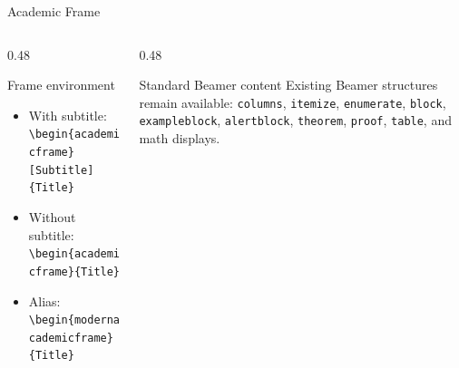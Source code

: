 \documentclass[aspectratio=169,10pt]{beamer}
\begin{document}
\begin{academicframe}{Academic Frame}
  \begin{columns}[T,onlytextwidth]
    \begin{column}{0.48\textwidth}
      \begin{block}{Frame environment}
        \scriptsize
        \begin{itemize}
          \item With subtitle:
            \texttt{\textbackslash begin\{academicframe\}[Subtitle]\{Title\}}
          \item Without subtitle:
            \texttt{\textbackslash begin\{academicframe\}\{Title\}}
          \item Alias:
            \texttt{\textbackslash begin\{modernacademicframe\}\{Title\}}
        \end{itemize}
      \end{block}
    \end{column}
    \begin{column}{0.48\textwidth}
      \begin{exampleblock}{Standard Beamer content}
        \scriptsize
        Existing Beamer structures remain available: \texttt{columns},
        \texttt{itemize}, \texttt{enumerate}, \texttt{block},
        \texttt{exampleblock}, \texttt{alertblock}, \texttt{theorem},
        \texttt{proof}, \texttt{table}, and math displays.
      \end{exampleblock}
    \end{column}
  \end{columns}
\end{academicframe}
\end{document}
